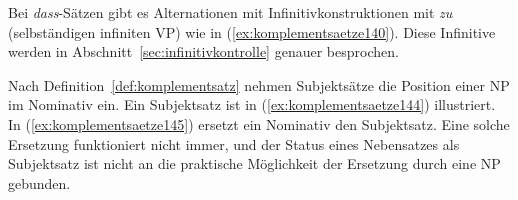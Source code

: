 \begin{exe}
  \ex\label{ex:komplementsaetze131}
  \begin{xlist}
  \end{xlist}
  \ex\label{ex:komplementsaetze134}
  \begin{xlist}
  \end{xlist}
  \ex\label{ex:komplementsaetze137}
  \begin{xlist}
  \end{xlist}
\end{exe}

Bei \textit{dass}-Sätzen gibt es Alternationen mit Infinitivkonstruktionen mit \textit{zu} (selbständigen infiniten VP) wie in (\ref{ex:komplementsaetze140}).
Diese Infinitive werden in Abschnitt~\ref{sec:infinitivkontrolle} genauer besprochen.

\begin{exe}
  \ex\label{ex:komplementsaetze140}
  \begin{xlist}
  \end{xlist}
\end{exe}

Nach Definition~\ref{def:komplementsatz} nehmen Subjektsätze die Position einer NP im Nominativ ein.
Ein Subjektsatz ist in (\ref{ex:komplementsaetze144}) illustriert.
In (\ref{ex:komplementsaetze145}) ersetzt ein Nominativ den Subjektsatz.
Eine solche Ersetzung funktioniert nicht immer, und der Status eines Nebensatzes als Subjektsatz ist nicht an die praktische Möglichkeit der Ersetzung durch eine NP gebunden.

\Np

\begin{exe}
  \ex\label{ex:komplementsaetze143}
  \begin{xlist}
  \end{xlist}
\end{exe}

